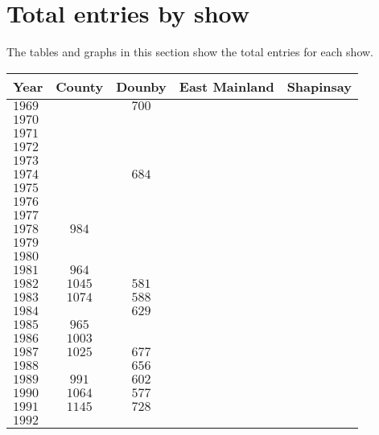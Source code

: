 \section*{Total entries by show}
The tables and graphs in this section show the total entries for each show.

\begin{longtable}{|l|cccc|}
\hline
    \textbf{Year} &
    \textbf{County} &
    \textbf{Dounby} &
    \textbf{East Mainland} &
    \textbf{Shapinsay}
    \\
\hline
\endhead
\hline
\endfoot
    $1969$  &       & $700$ &       &       \\
    $1970$  &       &       &       &       \\
    $1971$  &       &       &       &       \\
    $1972$  &       &       &       &       \\
    $1973$  &       &       &       &       \\
    $1974$  &       & $684$ &       &       \\		
    $1975$  &       &       &       &       \\
    $1976$  &       &       &       &       \\
    $1977$  &       &       &       &       \\
    $1978$  & $984$ &       &       &       \\
    $1979$  &       &       &       &       \\
    $1980$  &       &       &       &       \\
    $1981$  & $964$ &       &       &       \\
    $1982$  & $1045$& $581$ &       &       \\
    $1983$  & $1074$& $588$ &       &       \\
    $1984$  &       & $629$ &       &       \\
    $1985$  & $965$ &       &       &       \\
    $1986$  & $1003$&       &       &       \\
    $1987$  & $1025$& $677$ &       &       \\
    $1988$  &       & $656$ &       &       \\
    $1989$  & $991$ & $602$ &       &       \\
    $1990$  & $1064$& $577$ &       &       \\
    $1991$  & $1145$& $728$ &       &       \\
    $1992$  &       &       &       &       \\

\end{longtable}
